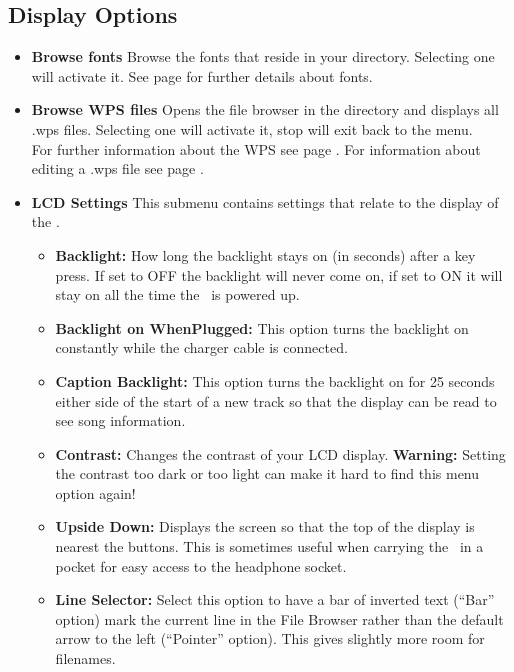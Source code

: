   \subsection{\label{ref:Displayoptions}Display Options}
  
  \begin{itemize}
  \item \textbf{Browse fonts}
    Browse the fonts that reside in your  directory. Selecting one will activate it. See page \pageref{ref:Loadingfonts} for further details about fonts.
    
  \item \textbf{Browse WPS files}
    Opens the file browser in the  directory and displays all .wps files. Selecting one will activate it, stop will exit back to the menu.\\
    For further information about the WPS see page \pageref{ref:WPS}. For information about editing a .wps file see page \pageref{ref:ConfiguringtheWPS}.
    
  \item \textbf{LCD Settings}
    This submenu contains settings that relate to the display of the \dap.
    \begin{itemize}
    \item \textbf{Backlight:} 
    How long the backlight stays on (in seconds) after a key press. If set to OFF the backlight will never come on, if set to ON it will stay on all the time the \dap\ is powered up.
    \item \textbf{Backlight on WhenPlugged:}
      This option turns the backlight on constantly while the charger cable is connected.
    \item \textbf{Caption Backlight:} This option turns the backlight on for 25 seconds either side of the start of a new track so that the display can be read to see song information.
    \item \textbf{Contrast:} Changes the contrast of your LCD display. \textbf{Warning:} Setting the contrast too dark or too light can make it hard to find this menu option again!
    \item \textbf{Upside Down: }Displays the screen so that the top of the display is nearest the buttons.  This is sometimes useful when carrying the \dap\ in a pocket for easy access to the headphone socket.
    \item \textbf{Line Selector: }Select this option to have a bar of inverted text (``Bar'' option) mark the current line in the File Browser rather than the default arrow to the left (``Pointer'' option).  This gives slightly more room for filenames.
    \end{itemize}
    

\end{itemize}

